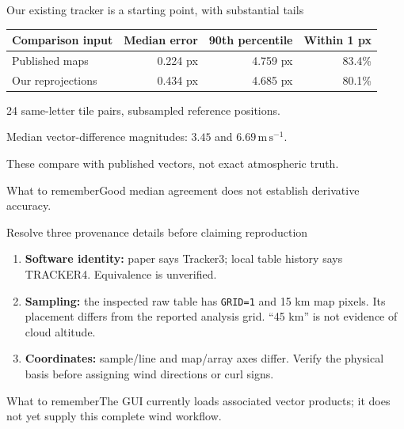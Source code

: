 \documentclass[aspectratio=169,11pt]{beamer}
\newcommand{\prov}{}
\newcommand{\evidence}[1]{\gdef\prov{#1}}
\newcommand{\takeaway}[1]{\vspace{0.3em}\begin{block}{What to remember}#1\end{block}}
\newcommand{\ms}{\mathrm{m\,s^{-1}}}
\begin{document}
\evidence{Repository evidence: saved docs/reports/tracking\_pj4.md summaries; not regenerated for this deck.}
\begin{frame}{Our existing tracker is a starting point, with substantial tails}
 \small
 \begin{tabularx}{\linewidth}{@{}Xrrr@{}}
 \toprule
 Comparison input & Median error & 90th percentile & Within 1 px\\
 \midrule
 Published maps & 0.224 px & 4.759 px & 83.4\%\\
 Our reprojections & 0.434 px & 4.685 px & 80.1\%\\
 \bottomrule
 \end{tabularx}
 \normalsize\vspace{0.45cm}
 24 same-letter tile pairs, subsampled reference positions.\par\medskip
 Median vector-difference magnitudes: $3.45$ and $6.69\,\ms$.
 \par\medskip
 These compare with published vectors, not exact atmospheric truth.
 \takeaway{Good median agreement does not establish derivative accuracy.}
\end{frame}

\evidence{Repository evidence: selected TP4 header, tracking.py, reproject.py, regions.py and api/science.py.}
\begin{frame}{Resolve three provenance details before claiming reproduction}
 \begin{enumerate}
 \item \textbf{Software identity:} paper says Tracker3; local table history
 says TRACKER4. Equivalence is unverified.
 \item \textbf{Sampling:} the inspected raw table has \texttt{GRID=1} and
 15 km map pixels. Its placement differs from the reported analysis grid.
 ``45 km'' is not evidence of cloud altitude.
 \item \textbf{Coordinates:} sample/line and map/array axes differ.
 Verify the physical basis before assigning wind directions or curl signs.
 \end{enumerate}
 \takeaway{The GUI currently loads associated vector products; it does not yet supply this complete wind workflow.}
\end{frame}
\end{document}
